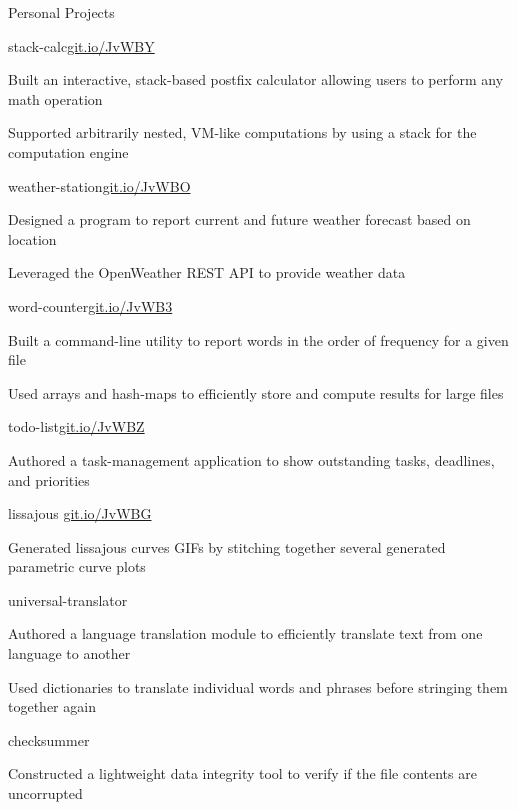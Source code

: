 \documentclass{resume} %
\begin{document}
\begin{rSection}{Personal Projects}
  \begin{rSubsection}{stack-calc}{\href{https://git.io/JvWBY}{git.io/JvWBY}}{}{}
    \item Built an interactive, stack-based postfix calculator allowing users
      to perform any math operation
    \item Supported arbitrarily nested, VM-like computations by using a stack
      for the computation engine
  \end{rSubsection}

  \begin{rSubsection}{weather-station}{\href{https://git.io/JvWBO}{git.io/JvWBO}}{}{}
    \item Designed a program to report current and future weather forecast
      based on location
    \item Leveraged the OpenWeather REST API to provide weather data
  \end{rSubsection}

  \begin{rSubsection} {word-counter}{\href{https://git.io/JvWB3}{git.io/JvWB3}}{}{}
    \item Built a command-line utility to report words in the order of
      frequency for a given file
    \item Used arrays and hash-maps to efficiently store and compute results
      for large files
  \end{rSubsection}

  \begin{rSubsection} {todo-list}{\href{https://git.io/JvWBZ}{git.io/JvWBZ}}{}{}
    \item Authored a task-management application to show outstanding tasks,
      deadlines, and priorities
  \end{rSubsection}

  \begin{rSubsection}{lissajous} {\href{https://git.io/JvWBG}{git.io/JvWBG}}{}{}
    \item Generated lissajous curves GIFs by stitching together several generated
      parametric curve plots
  \end{rSubsection}

  \begin{rSubsection} {universal-translator} {} {} {}
    \item Authored a language translation module to efficiently translate
      text from one language to another
    \item Used dictionaries to translate individual words and phrases before
      stringing them together again
  \end{rSubsection}

  \begin{rSubsection} {checksummer} {} {} {}
    \item Constructed a lightweight data integrity tool to verify if the file
      contents are uncorrupted
  \end{rSubsection}

\end{rSection}
\end{document}
